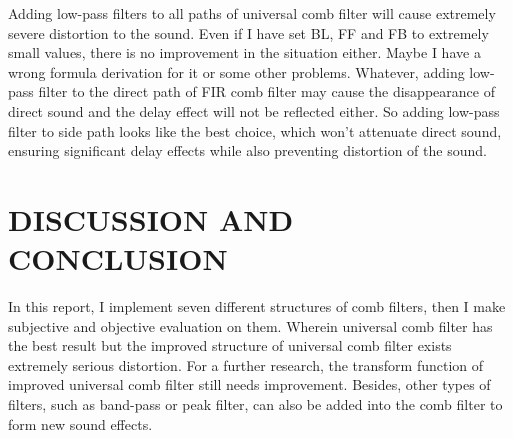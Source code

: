 \documentclass[a4paper]{tufte-handout} %
\begin{document}
Adding low-pass filters to all paths of universal comb filter will cause extremely severe distortion to the sound. Even if I have  set BL, FF and FB to extremely small values, there is no improvement in the situation either. Maybe I have a wrong formula derivation for it or some other problems. Whatever, adding low-pass filter to the direct path of FIR comb filter may cause the disappearance of direct sound and the delay effect will not be reflected either. So adding low-pass filter to side path looks like the best choice, which won't attenuate direct sound, ensuring significant delay effects while also preventing distortion of the sound.

\section{DISCUSSION AND CONCLUSION}
In this report, I implement seven different structures of comb filters, then I make subjective and objective evaluation on them. Wherein universal comb filter has the best result but the improved structure of universal comb filter exists extremely serious distortion. For a further research, the transform function of improved universal comb filter still needs improvement. Besides, other types of filters, such as band-pass or peak filter, can also be added into the comb filter to form new sound effects.
\end{document}
